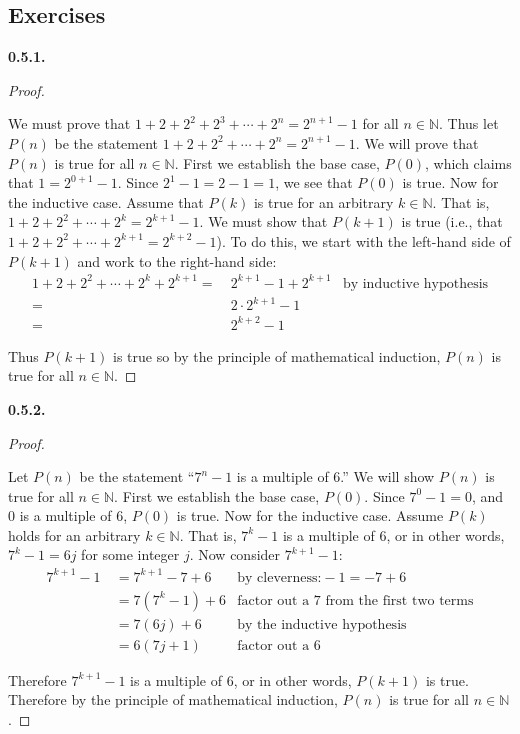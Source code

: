 \documentclass[10pt,]{book}
\theoremstyle{plain}
\theoremstyle{definition}
\theoremstyle{definition}
\theoremstyle{definition}
\theoremstyle{definition}
\numberwithin{equation}{chapter}
\newcommand{\N}{\mathbb N}
\newcommand{\amp}{&}
\begin{document}
\subsection*{ Exercises}
\noindent\textbf{0.5.1.} \begin{proof}\hypertarget{proof-5}{}
\hypertarget{p-433}{}%
We must prove that \(1 + 2 + 2^2 + 2^3 + \cdots +2^n = 2^{n+1} - 1\) for all \(n \in \N\). Thus let \(P(n)\) be the statement \(1 + 2 + 2^2 + \cdots + 2^n = 2^{n+1} - 1\). We will prove that \(P(n)\) is true for all \(n \in \N\). First we establish the base case, \(P(0)\), which claims that \(1 = 2^{0+1} -1\). Since \(2^1 - 1 = 2 - 1 = 1\), we see that \(P(0)\) is true. Now for the inductive case. Assume that \(P(k)\) is true for an arbitrary \(k \in \N\). That is, \(1 + 2 + 2^2 + \cdots + 2^k = 2^{k+1} - 1\). We must show that \(P(k+1)\) is true (i.e., that \(1 + 2 + 2^2 + \cdots + 2^{k+1} = 2^{k+2} - 1\)). To do this, we start with the left-hand side of \(P(k+1)\) and work to the right-hand side:%
\begin{align*}
1 + 2 + 2^2 + \cdots + 2^k + 2^{k+1} = \amp ~ 2^{k+1} - 1 + 2^{k+1} \amp \text{by inductive hypothesis}\\
= \amp ~2\cdot 2^{k+1} - 1 \amp\\
= \amp ~ 2^{k+2} - 1 \amp
\end{align*}
%
\par
\hypertarget{p-434}{}%
Thus \(P(k+1)\) is true so by the principle of mathematical induction, \(P(n)\) is true for all \(n \in \N\).%
\end{proof}
\par\smallskip
\noindent\textbf{0.5.2.} \begin{proof}\hypertarget{proof-6}{}
\hypertarget{p-436}{}%
Let \(P(n)\) be the statement ``\(7^n - 1\) is a multiple of 6.'' We will show \(P(n)\) is true for all \(n \in \N\). First we establish the base case, \(P(0)\). Since \(7^0 - 1 = 0\), and \(0\) is a multiple of 6, \(P(0)\) is true. Now for the inductive case. Assume \(P(k)\) holds for an arbitrary \(k \in \N\). That is, \(7^k - 1\) is a multiple of 6, or in other words, \(7^k - 1 = 6j\) for some integer \(j\). Now consider \(7^{k+1} - 1\):%
\begin{align*}
7^{k+1} - 1 ~ \amp = 7^{k+1} - 7 + 6 \amp \text{by cleverness:} -1 = -7 + 6\\
\amp = 7(7^k - 1) + 6 \amp \text{factor out a 7 from the first two terms}\\
\amp = 7(6j) + 6 \amp \text{by the inductive hypothesis}\\
\amp = 6(7j + 1) \amp \text{factor out a 6}
\end{align*}
%
\par
\hypertarget{p-437}{}%
Therefore \(7^{k+1} - 1\) is a multiple of 6, or in other words, \(P(k+1)\) is true. Therefore by the principle of mathematical induction, \(P(n)\) is true for all \(n \in \N\).%
\end{proof}
\end{document}
